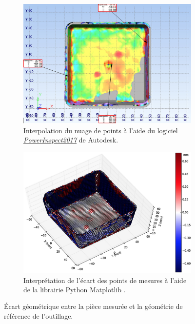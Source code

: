 \begin{figure}[bhtp]
	\centering
	\begin{subfigure}[c]{0.49\textwidth}
		\includegraphics[width=\textwidth]{../Chap2/Figures/Capture_2019-09-23-13_43_11.jpg}
		\caption{Interpolation du nuage de points à l'aide du logiciel \textit{\href{https://www.autodesk.fr/products/powerinspect/}{PowerInspect2017}} de Autodesk.}
	\end{subfigure}
	\begin{subfigure}[c]{0.49\textwidth}
		\includegraphics[width=\textwidth]{../Chap2/Figures/Capture_2019-09-23_13_42_00.jpg}
		\caption{Interprétation de l'écart des points de mesures à l'aide de la librairie Python \href{https://matplotlib.org/}{Matplotlib} \cite{hunter_matplotlib_2007, caswell_matplotlib_2019}.}
	\end{subfigure}
	\caption{Écart géométrique entre la pièce mesurée et la géométrie de référence de l'outillage.}
	\label{fig:scan_delta}
\end{figure}

